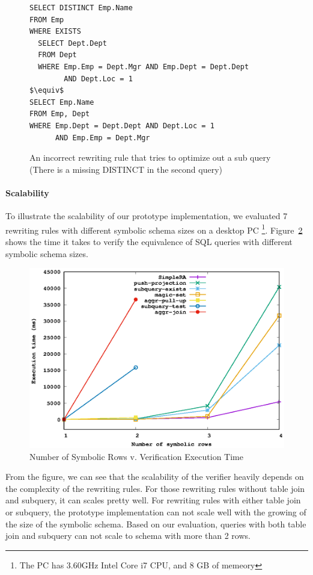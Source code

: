 \begin{figure}[!htb]
\begin{lstlisting}[style=sql,xleftmargin=.2\textwidth,mathescape=true]
SELECT DISTINCT Emp.Name
FROM Emp
WHERE EXISTS 
  SELECT Dept.Dept
  FROM Dept
  WHERE Emp.Emp = Dept.Mgr AND Emp.Dept = Dept.Dept
        AND Dept.Loc = 1
$\equiv$
SELECT Emp.Name
FROM Emp, Dept
WHERE Emp.Dept = Dept.Dept AND Dept.Loc = 1 
      AND Emp.Emp = Dept.Mgr
\end{lstlisting}
\caption{An incorrect rewriting rule that tries to optimize out a sub query
  (There is a missing DISTINCT in the second query)}
\label{fig:push-proj}
\end{figure}

\paragraph{Scalability}
To illustrate the scalability of our prototype implementation, we evaluated
7 rewriting rules with different symbolic schema sizes on a desktop PC
\footnote{The PC has 3.60GHz Intel Core i7 CPU, and 8 GB of memeory}.
Figure~\ref{fig:scale} shows the time it takes to verify the equivalence of SQL queries
with different symbolic schema sizes.

\begin{figure}[ht]
  \centering
  \includegraphics[width=0.7\linewidth]{scale.eps}
  \caption{Number of Symbolic Rows v. Verification Execution Time}
  \label{fig:scale}
\end{figure}

From the figure, we can see that the scalability of the verifier heavily depends 
on the complexity of the rewriting rules.
For those rewriting rules without table join and subquery, it can scales pretty well.
For rewriting rules with either table join or subquery, the prototype implementation can 
not scale well with the growing of the size of the symbolic schema.
Based on our evaluation, queries with both table join and subquery can not scale to schema with
more than 2 rows.

